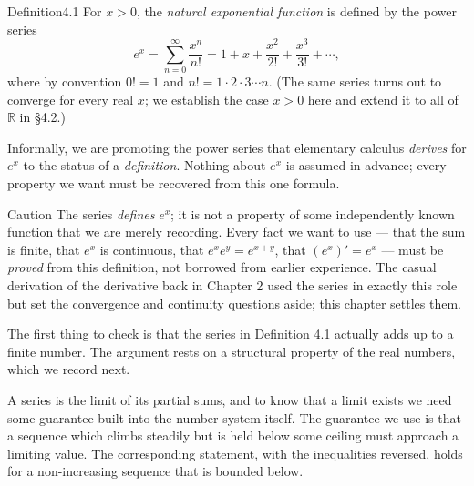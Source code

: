 \documentclass[a4paper,12pt,oneside]{memoir}
\begin{document}
\begin{envdefinition}{Definition}{4.1}{}
For \(x > 0\), the \emph{natural exponential function} is defined by the power series \[ e^{x} = \sum_{n = 0}^{\infty} \frac{x^{n}}{n!} = 1 + x + \frac{x^{2}}{2!} + \frac{x^{3}}{3!} + \cdots, \] where by convention \(0! = 1\) and \(n! = 1 \cdot 2 \cdot 3 \cdots n\). (The same series turns out to converge for every real \(x\); we establish the case \(x > 0\) here and extend it to all of \(\mathbb{R}\) in §4.2.)

\begin{informal}
Informally, we are promoting the power series that elementary calculus \emph{derives} for \(e^{x}\) to the status of a \emph{definition}. Nothing about \(e^{x}\) is assumed in advance; every property we want must be recovered from this one formula.
\end{informal}
\end{envdefinition}
\begin{envcaution}{Caution}{}{}
The series \emph{defines} \(e^{x}\); it is not a property of some independently known function that we are merely recording. Every fact we want to use — that the sum is finite, that \(e^{x}\) is continuous, that \(e^{x} e^{y} = e^{x + y}\), that \((e^{x})' = e^{x}\) — must be \emph{proved} from this definition, not borrowed from earlier experience. The casual derivation of the derivative back in Chapter 2 used the series in exactly this role but set the convergence and continuity questions aside; this chapter settles them.
\end{envcaution}
The first thing to check is that the series in Definition 4.1 actually adds up to a finite number. The argument rests on a structural property of the real numbers, which we record next.

A series is the limit of its partial sums, and to know that a limit exists we need some guarantee built into the number system itself. The guarantee we use is that a sequence which climbs steadily but is held below some ceiling must approach a limiting value. The corresponding statement, with the inequalities reversed, holds for a non-increasing sequence that is bounded below.
\end{document}
